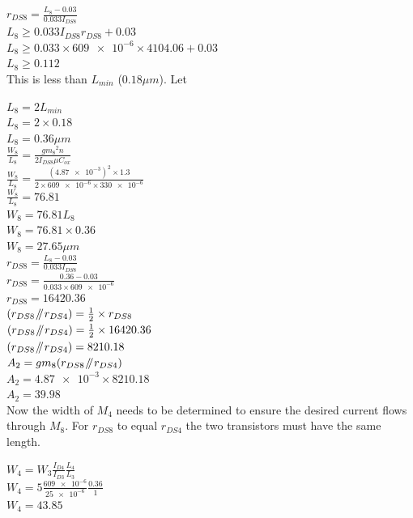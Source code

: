 $r_{DS8} = \frac{L_{8} - 0.03}{0.033I_{DS8}}$ \\
$L_{8} \ge 0.033I_{DS8}r_{DS8} + 0.03$ \\
$L_{8} \ge 0.033 \times \num{609e-6} \times 4104.06 + 0.03$ \\
$L_{8} \ge 0.112$ \\

This is less than $L_{min}$ ($0.18\mu m$).
Let

$L_{8} = 2L_{min}$ 	\\
$L_{8} = 2 \times 0.18$ \\
$L_{8} = 0.36\mu m$ \\

$\frac{W_{8}}{L_{8}} = \frac{{gm_{8}}^{2}n}{2I_{DS8}\mu C_{ox}}$ \\
$\frac{W_{8}}{L_{8}} = \frac{(\num{4.87e-3})^{2} \times 1.3}{2 \times \num{609e-6} \times \num{330e-6}}$ \\
$\frac{W_{8}}{L_{8}} = 76.81$ \\

$W_{8} = 76.81L_{8}$ \\
$W_{8} = 76.81 \times 0.36$ \\
$W_{8} = 27.65\mu m$ \\

$r_{DS8} = \frac{L_{8} - 0.03}{0.033I_{DS8}}$ \\
$r_{DS8} = \frac{0.36 - 0.03}{0.033 \times \num{609e-6}}$ \\
$r_{DS8} = 16420.36$ \\

$(r_{DS8} \mathbin{\!/\mkern-5mu/\!} r_{DS4}) = \frac{1}{2} \times r_{DS8}$ \\
$(r_{DS8} \mathbin{\!/\mkern-5mu/\!} r_{DS4}) = \frac{1}{2} \times 16420.36$ \\
$(r_{DS8} \mathbin{\!/\mkern-5mu/\!} r_{DS4}) = 8210.18$ \\

$A_{2} = gm_{8}(r_{DS8} \mathbin{\!/\mkern-5mu/\!} r_{DS4})$ \\
$A_{2} = \num{4.87e-3} \times 8210.18$ \\
$A_{2} = 39.98$ \\

Now the width of $M_{4}$ needs to be determined to ensure the desired current flows through $M_{8}$.
For $r_{DS8}$ to equal $r_{DS4}$ the two transistors must have the same length.

$W_{4} = W_{3}\frac{I_{D4}}{I_{D3}}\frac{L_{4}}{L_{3}}$ \\
$W_{4} = 5\frac{\num{609e-6}}{\num{25e-6}}\frac{0.36}{1}$ \\
$W_{4} = 43.85$ \\

